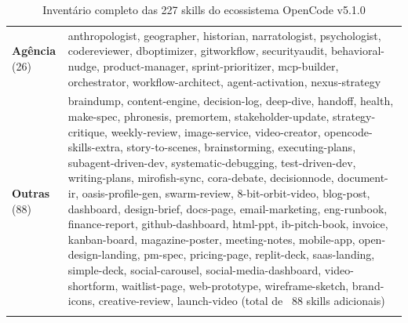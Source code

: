 \begin{longtable}{p{4cm}p{11cm}}
\textbf{Agência} (26) & 
anthropologist, geographer, historian, narratologist, psychologist, codereviewer, dboptimizer, gitworkflow, securityaudit, behavioral-nudge, product-manager, sprint-prioritizer, mcp-builder, orchestrator, workflow-architect, agent-activation, nexus-strategy \\
\addlinespace

\textbf{Outras} (88) & 
braindump, content-engine, decision-log, deep-dive, handoff, health, make-spec, phronesis, premortem, stakeholder-update, strategy-critique, weekly-review, image-service, video-creator, opencode-skills-extra, story-to-scenes, brainstorming, executing-plans, subagent-driven-dev, systematic-debugging, test-driven-dev, writing-plans, mirofish-sync, cora-debate, decisionnode, document-ir, oasis-profile-gen, swarm-review, 8-bit-orbit-video, blog-post, dashboard, design-brief, docs-page, email-marketing, eng-runbook, finance-report, github-dashboard, html-ppt, ib-pitch-book, invoice, kanban-board, magazine-poster, meeting-notes, mobile-app, open-design-landing, pm-spec, pricing-page, replit-deck, saas-landing, simple-deck, social-carousel, social-media-dashboard, video-shortform, waitlist-page, web-prototype, wireframe-sketch, brand-icons, creative-review, launch-video (total de ~88 skills adicionais) \\
\bottomrule
\caption{Inventário completo das 227 skills do ecossistema OpenCode v5.1.0}
\label{tab:skills-inventory}
\end{longtable}

\newpage
